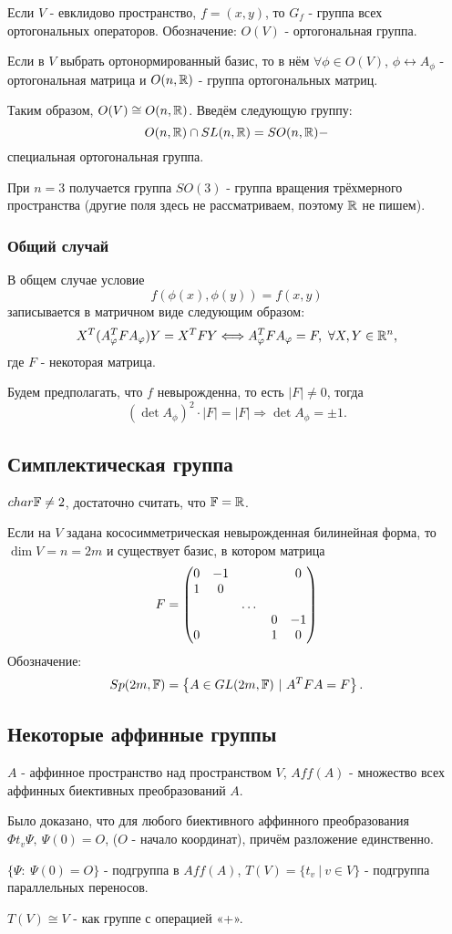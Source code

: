Если $V$ - евклидово пространство, $f = (x,y)$, то $G_f$ - группа всех ортогональных операторов. Обозначение: $O(V)$ - ортогональная группа.

Если в $V$ выбрать ортонормированный базис, то в нём $\forall \phi \in O(V)$, $\phi \longleftrightarrow A_{\phi}$ - ортогональная матрица и $O(n, \mathbb{R})$ - группа ортогональных матриц.

Таким образом, $O(V) \cong O(n, \mathbb{R})$. Введём следующую группу:
\[O(n, \mathbb{R}) \cap SL(n, \mathbb{R}) = SO(n, \mathbb{R}) - \]
специальная ортогональная группа.

При $n = 3$ получается группа $SO(3)$ - группа вращения трёхмерного пространства (другие поля здесь не рассматриваем, поэтому $\mathbb{R}$ не пишем).

\subsubsection*{Общий случай}
В общем случае условие
\[f(\phi(x), \phi(y)) = f(x,y)\]
записывается в матричном виде следующим образом:
\[X^T(A_{\varphi}^T F A_{\varphi}) Y = X^T F Y \Longleftrightarrow A_{\varphi}^T F A_{\varphi} = F, \ \forall X, Y \in \mathbb{R}^n,\]
где $F$ - некоторая матрица.

Будем предполагать, что $f$ невырожденна, то есть $|F| \neq 0$, тогда
\[(\det{A_{\phi}})^2 \cdot |F| = |F| \Longrightarrow \det{A_{\phi}} = \pm 1.\]

\subsection{Симплектическая группа}
$char \mathbb{F} \neq 2$, достаточно считать, что $\mathbb{F} = \mathbb{R}$.

Если на $V$ задана кососимметрическая невырожденная билинейная форма, то $\dim{V} = n = 2m$ и существует базис, в котором матрица 
\[F = \begin{pmatrix}
    0 & -1 & \empty & \empty & 0\\
    1 & 0 & \empty & \empty & \empty\\
    \empty & \empty & \dots & \empty \empty\\
    \empty & \empty & \empty & 0 & -1\\
    0 & \empty & \empty & 1 & 0\\
\end{pmatrix}\]
Обозначение: 
\[Sp(2m, \mathbb{F}) = \left\{A \in GL(2m, \mathbb{F}) \ | \ A^T F A = F\right\}.\]

\subsection{Некоторые аффинные группы}
$A$ - аффинное пространство над пространством $V$, $Aff(A)$ - множество всех аффинных биективных преобразований $A$.

Было доказано, что для любого биективного аффинного преобразования $\Phi t_v \Psi, \ \Psi(0) = O$, ($O$ - начало координат), причём разложение единственно.

$\{\Psi: \ \Psi(0) = O\}$ - подгруппа в $Aff(A)$, $T(V) = \{t_v \ | \ v \in V\}$ - подгруппа параллельных переносов.

$T(V) \cong V$ - как группе с операцией «+».